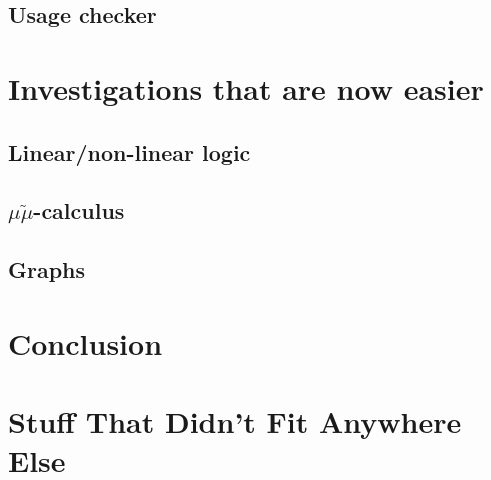 \documentclass[a4paper,oneside,11pt]{book}
\begin{document}
  \section{Usage checker}

\chapter{Investigations that are now easier}
  \section{Linear/non-linear logic}
  
  \section{$\mu\tilde\mu$-calculus}
  \section{Graphs}

\chapter{Conclusion}



\appendix
\chapter{Stuff That Didn't Fit Anywhere Else}




\end{document}
